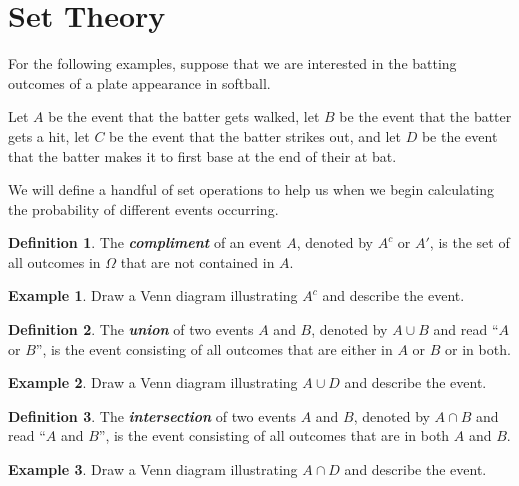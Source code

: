 \documentclass[
  11pt,
]{book}
\theoremstyle{definition}
\newtheorem{definition}{Definition}[chapter]
\theoremstyle{definition}
\newtheorem{example}{Example}[chapter]
\theoremstyle{definition}
\theoremstyle{definition}
\theoremstyle{remark}
\begin{document}
\newpage

\hypertarget{set-theory}{%
\section{Set Theory}\label{set-theory}}

For the following examples, suppose that we are interested in the batting outcomes of a plate appearance in softball.

Let \(A\) be the event that the batter gets walked, let \(B\) be the event that the batter gets a hit, let \(C\) be the event that the batter strikes out, and let \(D\) be the event that the batter makes it to first base at the end of their at bat.

We will define a handful of set operations to help us when we begin calculating the probability of different events occurring.

\begin{definition}
The \textbf{\emph{compliment}} of an event \(A\), denoted by \(A^c\) or \(A'\), is the set of all outcomes in \(\Omega\) that are not contained in \(A\).
\end{definition}

\begin{example}
Draw a Venn diagram illustrating \(A^c\) and describe the event.
\end{example}

\hfill\break
\hfill\break
\hfill\break
\hfill\break
\hfill\break

\begin{definition}
The \textbf{\emph{union}} of two events \(A\) and \(B\), denoted by \(A \cup B\) and read ``\(A\) or \(B\)'', is the event consisting of all outcomes that are either in \(A\) or \(B\) or in both.
\end{definition}

\begin{example}
Draw a Venn diagram illustrating \(A \cup D\) and describe the event.
\end{example}

\hfill\break
\hfill\break
\hfill\break
\hfill\break
\hfill\break

\begin{definition}
The \textbf{\emph{intersection}} of two events \(A\) and \(B\), denoted by \(A \cap B\) and read ``\(A\) and \(B\)'', is the event consisting of all outcomes that are in both \(A\) and \(B\).
\end{definition}

\begin{example}
Draw a Venn diagram illustrating \(A \cap D\) and describe the event.
\end{example}
\end{document}
